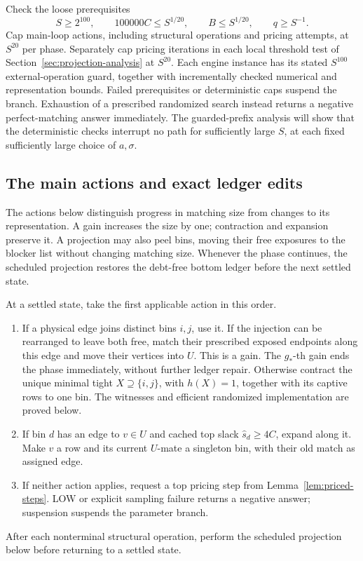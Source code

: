 Check the loose prerequisites
\begin{equation}
 S\ge2^{100},\qquad 100000C\le S^{1/20},\qquad
 B\le S^{1/20},\qquad q\ge S^{-1}.
 \label{match:initial-guards}
\end{equation}
Cap main-loop actions, including structural operations and pricing
attempts, at \(S^{20}\) per phase.  Separately cap pricing iterations in
each local threshold test of Section~\ref{sec:projection-analysis}
at \(S^{20}\).  Each engine instance has its stated \(S^{100}\)
external-operation guard, together with incrementally checked numerical
and representation bounds.  Failed prerequisites or deterministic caps
suspend the branch.  Exhaustion of a prescribed randomized search
instead returns a negative perfect-matching answer immediately.
The guarded-prefix analysis will show that the deterministic checks
interrupt no path for sufficiently large \(S\), at each fixed
sufficiently large choice of \(a,\sigma\).

\subsection{The main actions and exact ledger edits}

The actions below distinguish progress in matching size from changes
to its representation.  A gain increases the size by one; contraction
and expansion preserve it.  A projection may also peel bins, moving
their free exposures to the blocker list without changing matching
size.  Whenever the phase continues, the scheduled projection restores
the debt-free bottom ledger before the next settled state.

At a settled state, take the first applicable action in this order.
\begin{enumerate}[label=\arabic*.]
\item If a physical edge joins distinct bins \(i,j\), use it.
If the injection can be rearranged to leave both free, match their
prescribed exposed endpoints along this edge and move their vertices
into \(U\).  This is a gain.  The \(g_*\)-th gain ends the phase
immediately, without further ledger repair.
Otherwise contract the unique minimal tight \(X\supseteq\{i,j\}\),
with \(h(X)=1\), together with its captive rows to one bin.
The witnesses and efficient randomized implementation are proved below.
\item If bin \(d\) has an edge to \(v\in U\) and cached top slack
\(\widehat s_d\ge4C\), expand along it.  Make \(v\) a row and its
current \(U\)-mate a singleton bin, with their old match as assigned edge.
\item If neither action applies, request a top pricing step from
Lemma~\ref{lem:priced-steps}.  LOW or explicit sampling failure returns
a negative answer; suspension suspends the parameter branch.
\end{enumerate}
After each nonterminal structural operation, perform the scheduled
projection below before returning to a settled state.

